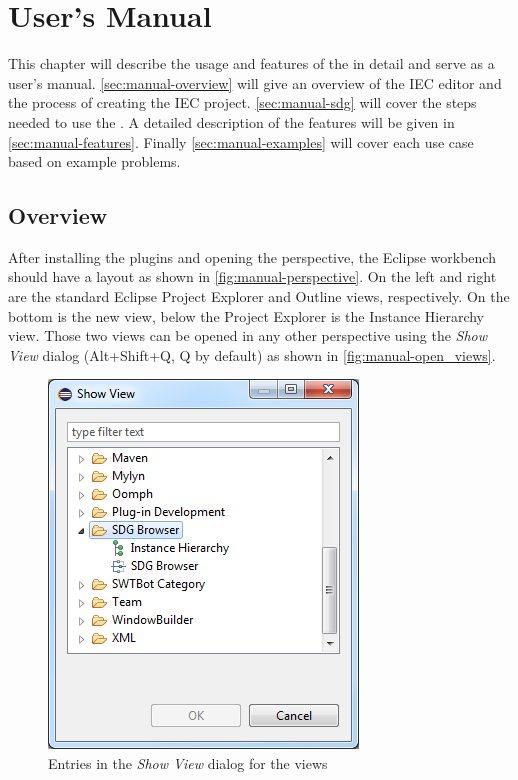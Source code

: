 \chapter{User's Manual} \label{ch:manual}

This chapter will describe the usage and features of the \SB in detail and serve as a user's manual. 
\autoref{sec:manual-overview} will give an overview of the IEC editor and the process of creating the IEC project. 
\autoref{sec:manual-sdg} will cover the steps needed to use the \SB. A detailed description of the \SB features will be 
given in \autoref{sec:manual-features}. Finally \autoref{sec:manual-examples} will cover each use case based on example 
problems.


\section{Overview} \label{sec:manual-overview}

After installing the \SB plugins and opening the \emph{\SB} perspective, the Eclipse workbench should have a layout as 
shown in \autoref{fig:manual-perspective}. On the left and right are the standard Eclipse Project Explorer and Outline 
views, respectively. On the bottom is the new \SB view, below the Project Explorer is the Instance Hierarchy view. 
Those two views can be opened in any other perspective using the \emph{Show View} dialog (Alt+Shift+Q, Q by default) as 
shown in \autoref{fig:manual-open_views}.

\begin{figure}[hp]
  \centering
    \includegraphics[scale=0.6]{bilder/manual-open_views}
  \caption{Entries in the \emph{Show View} dialog for the \SB views}
  \label{fig:manual-open_views}
\end{figure}

